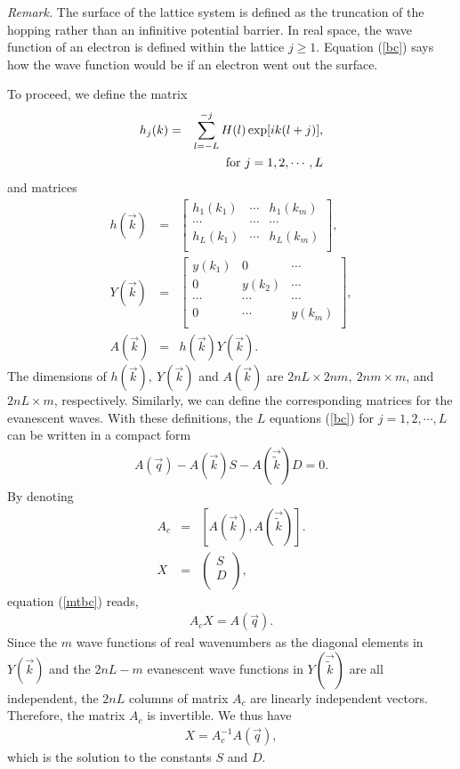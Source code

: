 \documentclass[aps,pra,amsmath,twocolumn,showpacs,bibnotes,10pt]{revtex4-1}
\begin{document}
{\it Remark.} The surface of the lattice system is defined as the truncation of the hopping rather than an infinitive potential barrier. In real space, the wave function of an electron is defined within the lattice $j \ge 1$. Equation (\ref{bc}) says how the wave function would be if an electron went out the surface. 

To proceed, we define the matrix 
\begin{eqnarray}
h_j(k)&=&\sum_{l=-L}^{-j}H(l)\exp[ik(l+j)],   \label{bc1}\\
&&~~{\rm for}~j=1,2,\cdots,L\nonumber
\end{eqnarray}
and matrices
\begin{eqnarray}
h(\vec k) &=& \begin{bmatrix}
	h_1(k_1)&\cdots&h_1(k_m)\\
	\cdots&\cdots&\cdots\\
	h_L(k_1)&\cdots&h_L(k_m)\\
\end{bmatrix},           \label{mth} \\
Y(\vec k) &=& \begin{bmatrix}
	y(k_1)&0&\cdots\\
	0&y(k_2)&\cdots\\
	\cdots&\cdots&\cdots\\
	0&\cdots&y(k_m)\\
\end{bmatrix},             \label{mtw}\\
A(\vec k)&=& h(\vec k)Y(\vec k). \label{mta}
\end{eqnarray}
The dimensions of $h(\vec k),~Y(\vec k)$ and $A(\vec k)$ are $2nL\times 2nm,~2nm\times m$, and $2nL\times m$, respectively. Similarly, we can define the corresponding matrices for the evanescent waves. With these definitions, the $L$ equations (\ref{bc}) for $j = 1,2,\cdots,L$ can be written in a compact form
\begin{eqnarray}
A(\vec q)-A(\vec k)S-A(\vec{\tilde k})D = 0. \label{mtbc}
\end{eqnarray}
By denoting
\begin{eqnarray}
A_c &=& [A(\vec k),A(\vec{\tilde k})]. \nonumber\\
X &=&\begin{pmatrix}
	S \\
	D \\
\end{pmatrix},                         \nonumber  
\end{eqnarray}
equation (\ref{mtbc}) reads,
\begin{eqnarray}
A_cX=A(\vec q). \label{bcc}
\end{eqnarray}
Since the $m$ wave functions of real wavenumbers as the diagonal elements in $Y({\vec k})$ and the $2nL-m$ evanescent wave functions in $Y(\vec{\tilde k})$ are all independent, the $2nL$ columns of matrix $A_c$ are linearly independent vectors. Therefore, the matrix $A_c$ is invertible. We thus have 
\begin{eqnarray}
X = A_c^{-1}A(\vec q), \label{slt}
\end{eqnarray}
which is the solution to the constants $S$ and $D$. 
\end{document}
